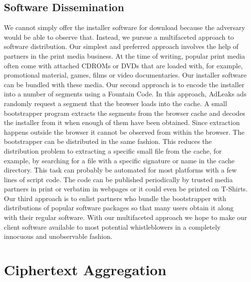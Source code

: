 \documentclass[twocolumn,10pt]{article}
\begin{document}
\subsection{Software Dissemination}
\label{sec:getit}

We cannot simply offer the installer software for download because the
adversary would be able to observe that.  Instead, we pursue a multifaceted
approach to software distribution.
Our simplest and preferred approach involves the help of partners in the
print media business.  At the time of writing, popular print media often
come with attached CDROMs or DVDs that are loaded with, for example,
promotional material, games, films or video documentaries.  Our installer
software can be bundled with these media.
Our second approach is to encode the installer into a number of segments
using a Fountain Code.  In this approach, AdLeaks ads randomly request a
segment that the browser loads into the cache.  A small bootstrapper program
extracts the segments from the browser cache and decodes the installer from
it when enough of them have been obtained.  Since extraction happens outside
the browser it cannot be observed from within the browser.  The bootstrapper
can be distributed in the same fashion.  This reduces the distribution
problem to extracting a specific small file from the cache, for example, by
searching for a file with a specific signature or name in the cache
directory.  This task can probably be automated for most platforms with a
few lines of script code.  The code can be published periodically by trusted
media partners in print or verbatim in webpages or it could even be printed
on T-Shirts.
Our third approach is to enlist partners who bundle the bootstrapper with
distributions of popular software packages so that many users obtain it
along with their regular software.
With our multifaceted approach we hope to make our client software available
to most potential whistleblowers in a completely innocuous and unobservable
fashion.


\section{Ciphertext Aggregation}
\label{sec:crypto}
\end{document}
